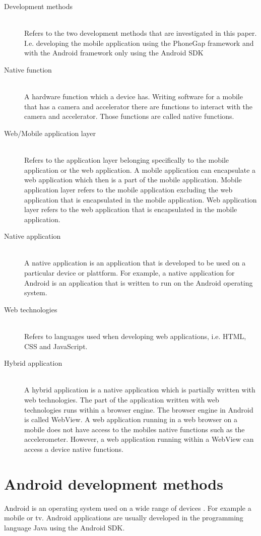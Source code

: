 \begin{description}
  \item[Development methods] \hfill \\
    Refers to the two development methods that are investigated in this paper. I.e. developing the mobile application using the PhoneGap framework and with the Android framework only using the Android SDK
  \item[Native function] \hfill \\
     A hardware function which a device has. Writing software for a mobile that has a camera and accelerator there are functions to interact with the camera and accelerator. Those functions are called native functions.
  \item[Web/Mobile application layer] \hfill \\
		Refers to the application layer belonging specifically to the mobile application or the web application. A mobile application can encapsulate a web application which then is a part of the mobile application. Mobile application layer refers to the mobile application excluding the web application that is encapsulated in the mobile application. Web application layer refers to the web application that is encapsulated in the mobile application. 
	\item[Native application] \hfill \\
	A native application is an application that is developed to be used on a particular device or plattform. For example, a native application for Android is an application that is written to run on the Android operating system.
\item[Web technologies] \hfill \\
	Refers to languages used when developing web applications, i.e. HTML, CSS and JavaScript.
\item[Hybrid application] \hfill \\
	A hybrid application is a native application which is partially written with web technologies. The part of the application written with web technologies runs within a browser engine. The browser engine in Android is called WebView. A web application running in a web browser on a mobile does not have access to the mobiles native functions such as the accelerometer. However, a web application running within a WebView can access a device native functions. 
\end{description}

\section{Android development methods}\label{sec:android-development-methods}
Android is an operating system used on a wide range of devices \cite{dell2011}. For example a mobile or tv. Android applications are usually developed in the programming language Java using the Android SDK.


